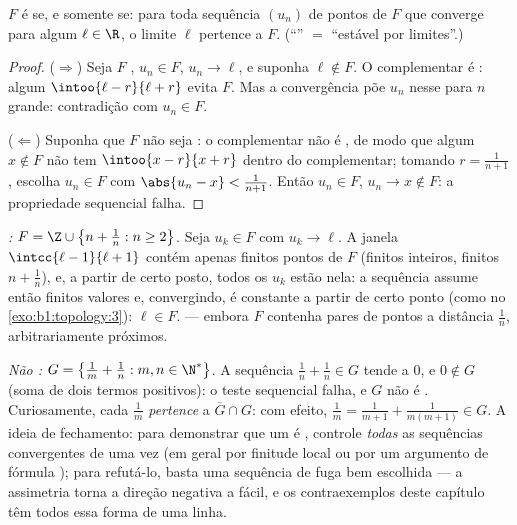 \begin{theorem}\label{thm:b1:topology:seqclosed}
$F$ é  se, e somente se: para toda sequência $(u_n)$ de pontos
de $F$ que converge para algum $\ell \in \R$, o limite $\ell$ pertence a
$F$. (``'' $=$ ``estável por limites''.)
\end{theorem}

\begin{proof}
($\Rightarrow$) Seja $F$ , $u_n \in F$, $u_n \to \ell$, e
suponha $\ell \notin F$. O complementar é : algum
$\intoo{\ell - r}{\ell + r}$ evita $F$. Mas a convergência põe $u_n$
nesse  para $n$ grande: contradição com $u_n \in F$.

($\Leftarrow$) Suponha que $F$ não seja : o complementar não é ,
de modo que algum $x \notin F$ não tem  $\intoo{x - r}{x + r}$ dentro
do complementar; tomando $r = \frac{1}{n+1}$, escolha $u_n \in F$ com
$\abs{u_n - x} < \frac{1}{n+1}$. Então $u_n \in F$, $u_n \to x \notin
F$: a propriedade sequencial falha.
\end{proof}

\begin{example}\label{ex:b1:topology:seqtest}
\emph{:} $F = \Z \cup \bigl\{n + \frac1n : n \geq 2\bigr\}$.
Seja $u_k \in F$ com $u_k \to \ell$. A janela $\intcc{\ell -
1}{\ell + 1}$ contém apenas finitos pontos de $F$ (finitos inteiros, finitos
$n + \frac1n$), e, a partir de certo posto, todos os $u_k$ estão nela:
a sequência assume então finitos valores e, convergindo, é
constante a partir de certo ponto (como no
\cref{exo:b1:topology:3}): $\ell \in F$.  --- embora
$F$ contenha pares de pontos a distância $\frac1n$, arbitrariamente
próximos.

\emph{Não :} $G = \bigl\{\frac1m + \frac1n : m, n \in
\N^*\bigr\}$. A sequência $\frac1n + \frac1n \in G$ tende a
$0$, e $0 \notin G$ (soma de dois termos positivos): o
teste sequencial falha, e $G$ não é . Curiosamente, cada
$\frac1m$ \emph{pertence} a $\overline G \cap G$: com efeito,
$\frac1m = \frac{1}{m+1} + \frac{1}{m(m+1)} \in G$. A ideia de
fechamento: para demonstrar que um  é , controle
\emph{todas} as sequências convergentes de uma vez (em geral por
finitude local ou por um argumento de fórmula ); para refutá-lo,
basta uma sequência de fuga bem escolhida --- a assimetria torna a
direção negativa a fácil, e os contraexemplos deste capítulo têm todos
essa forma de uma linha.
\end{example}

